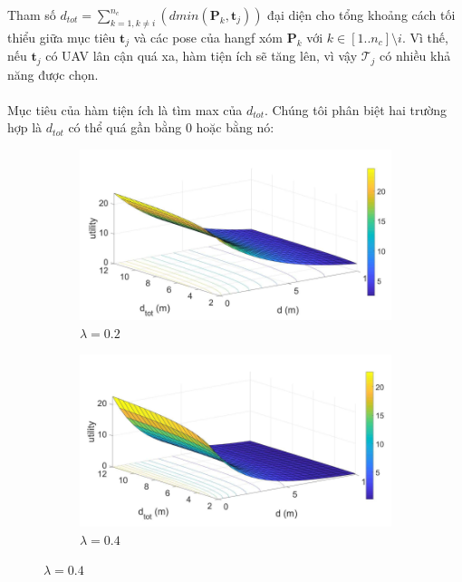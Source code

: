 \documentclass[11pt,openany]{book}
\begin{document}
Tham số $d_{tot} = \sum_{k=1, k\neq i}^{n_c}(dmin(\mathbf{P}_k,\mathbf{t}_j)) $ đại diện cho tổng khoảng cách tối thiểu giữa mục tiêu $\mathbf{t}_j$ và các pose của hangf xóm $\mathbf{P}_k$ với $k \in [1..n_c]\setminus i$. Vì thế, nếu $\mathbf{t}_j$ có UAV lân cận quá xa, hàm tiện ích sẽ tăng lên, vì vậy $\mathcal{T}_j$ có nhiều khả năng được chọn.\\\\
Mục tiêu của hàm tiện ích là tìm max của $d_{tot}$. Chúng tôi phân biệt hai trường hợp là $d_{tot}$ có thể quá gần bằng 0 hoặc bằng nó:
\begin{figure}[H]
    \centering
    \begin{subfigure}[H]{0.4\linewidth}
        \centering
        \includegraphics[width=\linewidth]{assets/3_8_a.png}
        \caption{{$\lambda=0.2$}}
        \label{fig:3.8a}
    \end{subfigure}
    \begin{subfigure}[H]{0.4\linewidth}
        \centering
        \includegraphics[width=\linewidth]{assets/3_8_b.png}
        \caption{{$\lambda=0.4$}}
        \label{fig:3.8b}
    \end{subfigure}

\end{figure}
\end{document}
